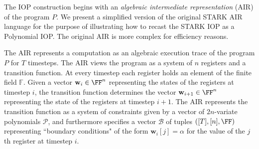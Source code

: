 The IOP construction begins with an \emph{algebraic intermediate representation} (AIR) of the program $P$.  
We present a simplified version of the original \textsf{STARK} AIR language for the purpose of illustrating how to recast the \textsf{STARK} IOP as a Polynomial IOP.  %
The original AIR is more complex for efficiency reasons.

The AIR represents a computation as an algebraic execution trace of the program $P$ for $T$ timesteps. The AIR views the program as a system of $n$ registers and a transition function. At every timestep each register holds an element of the finite field $\mathbb{F}$. Given a vector $\mathbf{w}_i \in \FF^n$ representing the states of the registers at timestep $i$, the transition function determines the vector $\mathbf{w}_{i+1} \in \FF^n$ representing the state of the registers at timestep $i+1$. The AIR represents the transition function as a system of constraints given by a vector of $2n$-variate polynomials $\boldsymbol{\mathcal{P}}$, and furthermore specifies a vector $\boldsymbol{\mathcal{B}}$ of tuples $([T], [n], \FF)$ representing ``boundary conditions" of the form $\mathbf{w}_i[j] = \alpha$ for the value of the $j$th register at timestep $i$.  



